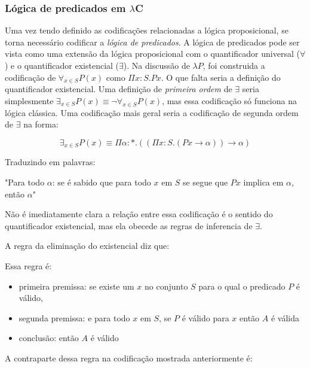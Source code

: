 \documentclass[../main.tex]{subfiles}
\begin{document}
\subsubsection{Lógica de predicados em \texorpdfstring{$\lambda$C}{LC}}

Uma vez tendo definido as codificações relacionadas a lógica proposicional, se torna necessário codificar a \emph{lógica de predicados}. A lógica de predicados pode ser vista como uma extensão da lógica proposicional com o quantificador universal ($\forall$) e o quantificador existencial ($\exists$).
Na discussão de $\lambda P$, foi construida a codificação de $\forall_{x \in S} P(x)$ como $\Pi x : S . Px$. O que falta seria a definição do quantificador existencial. Uma definição de \emph{primeira ordem} de $\exists$ seria simplesmente $\exists_{x \in S} P(x) \equiv \neg \forall_{x \in S} P(x)$, mas essa codificação só funciona na lógica clássica. Uma codificação mais geral seria a codificação de segunda ordem de $\exists$ na forma:

$$\exists_{x \in S} P(x) \equiv \Pi \alpha : \ast . ((\Pi x : S . (Px \to \alpha)) \to \alpha)$$

Traduzindo em palavras:

"Para todo $\alpha$: se é sabido que para todo $x$ em $S$ se segue que $Px$ implica em $\alpha$, então $\alpha$"

Não é imediatamente clara a relação entre essa codificação é o sentido do quantificador existencial, mas ela obecede as regras de inferencia de $\exists$.

A regra da eliminação do existencial diz que:

\begin{prooftree}
\end{prooftree}

Essa regra é:
\begin{itemize}
    \item primeira premissa: se existe um $x$ no conjunto $S$ para o qual o predicado $P$ é válido,
    \item segunda premissa: e para todo $x$ em $S$, se $P$ é válido para $x$ então $A$ é válida
    \item conclusão: então $A$ é válido
\end{itemize}

A contraparte dessa regra na codificação mostrada anteriormente é:
\end{document}

